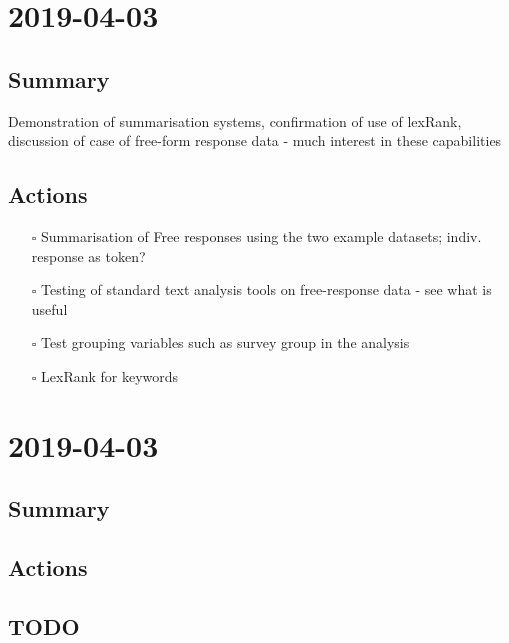 \documentclass[11pt]{article}
\begin{document}
\section{2019-04-03}
\label{sec:org3f8b161}
\subsection{Summary}
\label{sec:org132af34}
Demonstration of summarisation systems, confirmation of use of lexRank,
discussion of case of free-form response data - much interest in these
capabilities

\subsection{Actions}
\label{sec:orgd1ccbad}
\begin{itemize}
\item[{$\square$}] Summarisation of Free responses using the two example datasets;
indiv. response as token?
\item[{$\square$}] Testing of standard text analysis tools on free-response data - see
what is useful
\item[{$\square$}] Test grouping variables such as survey group in the analysis
\item[{$\square$}] LexRank for keywords
\end{itemize}

\section{2019-04-03}
\label{sec:orge83fc28}
\subsection{Summary}
\label{sec:org06b65a9}

\subsection{Actions}
\label{sec:org5add0f3}

\subsection{{\bfseries\sffamily TODO} }
\label{sec:orgae31cc8}
\end{document}
